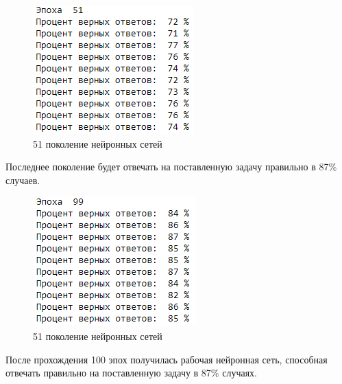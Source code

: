\begin{figure}[H]
  \centering
  \includegraphics[width=0.4\linewidth]{./img/second-epoch}
  \caption{51 поколение нейронных сетей}
  \label{fig:mpr} 
\end{figure}

Последнее поколение будет отвечать на поставленную задачу правильно в 87\% случаев.

\begin{figure}[H]
  \centering
  \includegraphics[width=0.4\linewidth]{./img/third-epoch}
  \caption{51 поколение нейронных сетей}
  \label{fig:mpr} 
\end{figure}

После прохождения 100 эпох получилась рабочая нейронная сеть, способная отвечать правильно на поставленную задачу в 87\% случаях. 